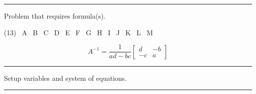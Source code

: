 \noindent\rule{\textwidth}{1pt}

\begin{question}{6}
  \label{question:formula-problem}
  Problem that requires formula(s).
\end{question}
\begin{tasks}(13)
  \task[\selectall] \ A
  \task[\selectall] \ B
  \task[\selectall] \ C
  \task[\selectall] \ D
  \task[\selectall] \ E
  \task[\selectall] \ F
  \task[\selectall] \ G
  \task[\correctselectall] \ H
  \task[\selectall] \ I
  \task[\selectall] \ J
  \task[\selectall] \ K
  \task[\selectall] \ L
  \task[\selectall] \ M
\end{tasks}
\begin{minipage}{0.75\textwidth}
  \begin{solution}
    \[A^{-1} = \dfrac{1}{ad - bc}
      \begin{bmatrix}
        d & -b \\
        -c & a
      \end{bmatrix}
    \]
  \end{solution}
\end{minipage}\hspace{\fill}%
\begin{minipage}{0.25\textwidth}
  \vspace{0.5in}
  \vspace{0.1in}
\end{minipage}

\noindent\rule{\textwidth}{1pt}

\begin{question}{6}
  \label{question:setup-system}
  Setup variables and system of equations.
\end{question}
\begin{minipage}{0.45\textwidth}
\end{minipage}\hspace{\fill}%
\begin{minipage}{0.45\textwidth}
\end{minipage}

\noindent\rule{\textwidth}{1pt}

\pagebreak

